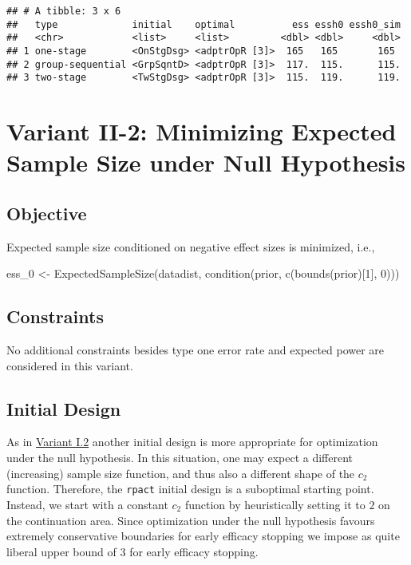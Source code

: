 \documentclass[
]{book}
\newenvironment{Shaded}{\begin{snugshade}}{\end{snugshade}}
\newcommand{\DecValTok}[1]{\textcolor[rgb]{0.00,0.00,0.81}{#1}}
\newcommand{\FunctionTok}[1]{\textcolor[rgb]{0.00,0.00,0.00}{#1}}
\newcommand{\NormalTok}[1]{#1}
\newcommand{\OtherTok}[1]{\textcolor[rgb]{0.56,0.35,0.01}{#1}}
\begin{document}
\begin{verbatim}
## # A tibble: 3 x 6
##   type             initial    optimal          ess essh0 essh0_sim
##   <chr>            <list>     <list>         <dbl> <dbl>     <dbl>
## 1 one-stage        <OnStgDsg> <adptrOpR [3]>  165   165       165 
## 2 group-sequential <GrpSqntD> <adptrOpR [3]>  117.  115.      115.
## 3 two-stage        <TwStgDsg> <adptrOpR [3]>  115.  119.      119.
\end{verbatim}

\hypertarget{variantII_2}{%
\section{Variant II-2: Minimizing Expected Sample Size under Null Hypothesis}\label{variantII_2}}

\hypertarget{objective-4}{%
\subsection{Objective}\label{objective-4}}

Expected sample size conditioned on negative effect sizes is minimized, i.e.,

\begin{Shaded}
\begin{Highlighting}[]
\NormalTok{ess\_0 }\OtherTok{\textless{}{-}} \FunctionTok{ExpectedSampleSize}\NormalTok{(datadist, }\FunctionTok{condition}\NormalTok{(prior, }\FunctionTok{c}\NormalTok{(}\FunctionTok{bounds}\NormalTok{(prior)[}\DecValTok{1}\NormalTok{], }\DecValTok{0}\NormalTok{)))}
\end{Highlighting}
\end{Shaded}

\hypertarget{constraints-4}{%
\subsection{Constraints}\label{constraints-4}}

No additional constraints besides type one error rate and expected power
are considered in this variant.

\hypertarget{initial-design-3}{%
\subsection{Initial Design}\label{initial-design-3}}

As in \protect\hyperlink{variantI_2}{Variant I.2} another initial design is more appropriate
for optimization under the null hypothesis.
In this situation, one may expect a different (increasing) sample size function,
and thus also a different shape of the \(c_2\) function.
Therefore, the \texttt{rpact} initial design is a suboptimal starting point.
Instead, we start with a constant \(c_2\) function by heuristically
setting it to \(2\) on the continuation area.
Since optimization under the null hypothesis favours extremely conservative
boundaries for early efficacy stopping we impose as quite liberal upper bound
of \(3\) for early efficacy stopping.
\end{document}
